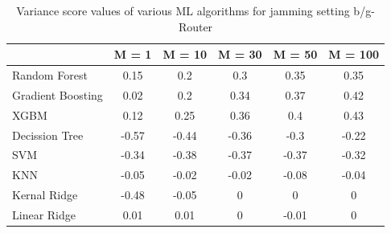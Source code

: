 \begin{table}[!ht]
	\centering
	\caption{Variance score values of various ML algorithms for jamming setting b/g-Router}
	\begin{tabular}{|p{5.3em}|c|c|c|c|c|}
		\toprule
		& \multicolumn{1}{p{2.4em}|}{M = 1} & \multicolumn{1}{p{2.9em}|}{M = 10} & \multicolumn{1}{p{2.9em}|}{M = 30} & \multicolumn{1}{p{2.9em}|}{M = 50} & \multicolumn{1}{p{3.4em}|}{M = 100} \\
		\midrule
		Random Forest	 & 0.15  & 0.2   & 0.3   & 0.35  & 0.35 \\
		\midrule
		Gradient Boosting  & 0.02  & 0.2   & 0.34  & 0.37  & 0.42 \\
		\midrule
		XGBM  & 0.12  & 0.25  & 0.36  & 0.4   & 0.43 \\
		\midrule
		Decission Tree & -0.57 & -0.44 & -0.36 & -0.3  & -0.22 \\
		\midrule
		SVM   & -0.34 & -0.38 & -0.37 & -0.37 & -0.32 \\
		\midrule
		KNN   & -0.05 & -0.02 & -0.02 & -0.08 & -0.04 \\
		\midrule
		Kernal Ridge & -0.48 & -0.05 & 0     & 0     & 0 \\
		\midrule
		Linear Ridge & 0.01  & 0.01  & 0     & -0.01 & 0 \\
		\bottomrule
	\end{tabular}%
	\label{ftml-jrnl:tab:T2}%
\end{table}%



